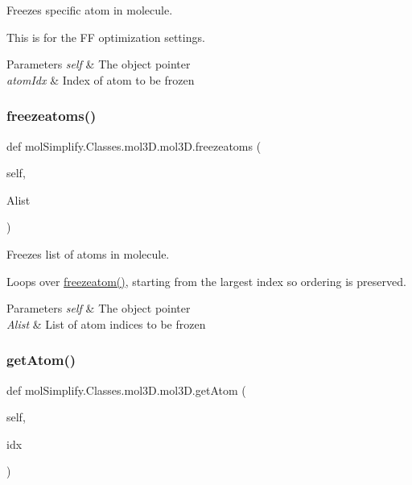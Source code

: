 Freezes specific atom in molecule. 

This is for the FF optimization settings. 
\begin{DoxyParams}{Parameters}
{\em self} & The object pointer \\
\hline
{\em atom\+Idx} & Index of atom to be frozen \\
\hline
\end{DoxyParams}
\mbox{\label{classmolSimplify_1_1Classes_1_1mol3D_1_1mol3D_a629f2ff84af7df7a809fe5e8f879f6a3}} 
\subsubsection{\texorpdfstring{freezeatoms()}{freezeatoms()}}
{\footnotesize\ttfamily def mol\+Simplify.\+Classes.\+mol3\+D.\+mol3\+D.\+freezeatoms (\begin{DoxyParamCaption}\item[{}]{self,  }\item[{}]{Alist }\end{DoxyParamCaption})}



Freezes list of atoms in molecule. 

Loops over \hyperlink{classmolSimplify_1_1Classes_1_1mol3D_1_1mol3D_a3d0541772724aa1a54e8cb6c8de77ea7}{freezeatom()}, starting from the largest index so ordering is preserved. 
\begin{DoxyParams}{Parameters}
{\em self} & The object pointer \\
\hline
{\em Alist} & List of atom indices to be frozen \\
\hline
\end{DoxyParams}
\mbox{\label{classmolSimplify_1_1Classes_1_1mol3D_1_1mol3D_ad30b31562cb3c57c2758554ff7e3714d}} 
\subsubsection{\texorpdfstring{get\+Atom()}{getAtom()}}
{\footnotesize\ttfamily def mol\+Simplify.\+Classes.\+mol3\+D.\+mol3\+D.\+get\+Atom (\begin{DoxyParamCaption}\item[{}]{self,  }\item[{}]{idx }\end{DoxyParamCaption})}



